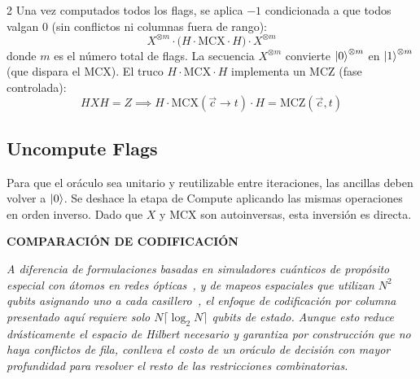 \documentclass[9pt, a4paper]{extarticle}
\begin{document}
\begin{multicols}{2}
Una vez computados todos los flags, se aplica $-1$ condicionada a
que todos valgan 0 (sin conflictos ni columnas fuera de rango):
\begin{equation}
    X^{\otimes m}\!\cdot\!\big(H\!\cdot\!\text{MCX}\!\cdot\!H\big)\!\cdot\!X^{\otimes m}
\end{equation}
donde $m$ es el n\'umero total de flags. La secuencia $X^{\otimes m}$
convierte $\ket{0}^{\otimes m}$ en $\ket{1}^{\otimes m}$ (que dispara el
MCX). El truco $H \cdot \text{MCX} \cdot H$ implementa un MCZ (fase
controlada):
\begin{equation}
    HXH = Z \implies H \cdot \text{MCX}(\vec{c} \to t) \cdot H = \text{MCZ}(\vec{c}, t)
\end{equation}

\subsection{Uncompute Flags}

Para que el or\'aculo sea unitario y reutilizable entre iteraciones,
las ancillas deben volver a $\ket{0}$. Se deshace la etapa de Compute
aplicando las mismas operaciones en orden inverso. Dado que $X$ y MCX
son autoinversas, esta inversi\'on es directa.

\vspace{0.3cm}
\noindent
\colorbox{boxbg}{%
\begin{minipage}{\dimexpr\columnwidth-2\fboxsep\relax}
\vspace{2pt}
{\small\sffamily\bfseries\color{accent} COMPARACI\'ON DE CODIFICACI\'ON}\par\vspace{1pt}
{\small\itshape
A diferencia de formulaciones basadas en simuladores cu\'anticos
de prop\'osito especial con \'atomos en redes \'opticas~\cite{torggler2019},
y de mapeos espaciales que utilizan
$N^2$ qubits asignando uno a cada casillero~\cite{jha2018, santhosh2023},
el enfoque de codificaci\'on por columna presentado aqu\'i requiere solo
$N \lceil\log_2 N\rceil$ qubits de estado. Aunque esto reduce dr\'asticamente
el espacio de Hilbert necesario y garantiza por construcci\'on que no haya
conflictos de fila, conlleva el costo de un or\'aculo de decisi\'on con
mayor profundidad para resolver el resto de las restricciones combinatorias.
}
\vspace{2pt}
\end{minipage}}
\vspace{0.3cm}


\end{multicols}
\end{document}
